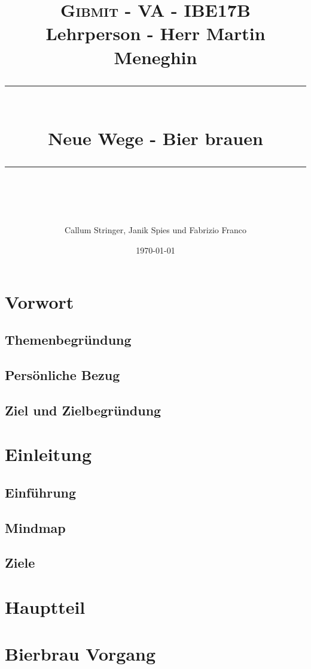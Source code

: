 \documentclass[12pt]{scrartcl}
\title{	
	\normalfont\small
	\textsc{Gibmit - VA - IBE17B}\\ 
	{Lehrperson - Herr Martin Meneghin}
	\vspace{25pt} 
	\rule{\linewidth}{0.5pt}\\
	\vspace{16pt} 
	{\huge Neue Wege - Bier brauen}\\ 
	\vspace{10pt} 
	\rule{\linewidth}{2pt}\\ 
	\author{\large Callum Stringer, Janik Spies und Fabrizio Franco} 
	\vspace{12pt} 
	\date{\small\today} 
}
\begin{document}
\maketitle
\thispagestyle{empty}
\newpage
\tableofcontents

\section{Vorwort}
\subsection{Themenbegründung}
\subsection{Persönliche Bezug}
\subsection{Ziel und Zielbegründung}

\section{Einleitung}
\subsection{Einführung}

\newpage


\subsection{Mindmap}


\subsection{Ziele} \label{introduction}

\section{Hauptteil}
\section{Bierbrau Vorgang}
\end{document}
